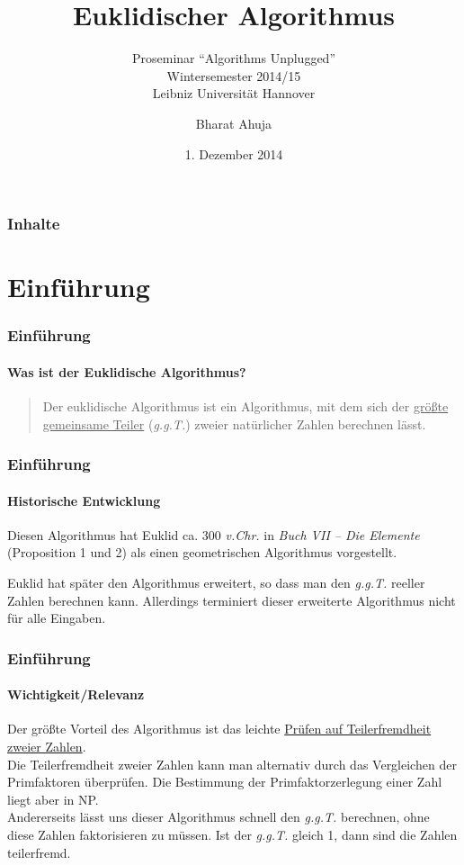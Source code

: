 \documentclass[•]{beamer}
\title{Euklidischer Algorithmus}
\subtitle{Proseminar ``Algorithms Unplugged''\\
Wintersemester 2014/15\\ 
Leibniz Universit\"at Hannover}
\date{1. Dezember 2014}
\author{Bharat Ahuja}
\begin{document}
\maketitle

\begin{frame}
	\frametitle{Inhalte}
	\tableofcontents[]
\end{frame}

\section{Einf\"uhrung}
\begin{frame}
	\frametitle{Einf\"uhrung}
    \framesubtitle{Was ist der Euklidische Algorithmus?}
    \begin{quote}
    Der euklidische Algorithmus ist ein Algorithmus, mit dem sich der 		\underline{gr\"o{\ss}te gemeinsame Teiler} (\textit{g.g.T.}) 			zweier nat\"urlicher Zahlen berechnen l\"asst. 
    
    \end{quote} 
\end{frame}

\begin{frame}       
	\frametitle{Einf\"uhrung}
    \framesubtitle{Historische Entwicklung}
    Diesen Algorithmus hat Euklid ca. 300 \textit{v.Chr.} in 				\textit{Buch VII -- Die Elemente} (Proposition 1 und 2) als einen 		geometrischen Algorithmus vorgestellt. 
    
    Euklid hat sp\"ater den Algorithmus erweitert, so dass man den 			\textit{g.g.T.} reeller Zahlen berechnen kann. Allerdings 				terminiert dieser erweiterte Algorithmus nicht f\"ur alle 				Eingaben.
    \end{frame}

\begin{frame}
	\frametitle{Einf\"uhrung}
    \framesubtitle{Wichtigkeit/Relevanz}
    Der gr\"o{\ss}te Vorteil des Algorithmus ist das leichte \underline{Pr\"ufen auf Teilerfremdheit zweier Zahlen}. \\ Die Teilerfremdheit zweier Zahlen kann man alternativ durch das Vergleichen der Primfaktoren \"uberpr\"ufen. Die Bestimmung der Primfaktorzerlegung einer Zahl liegt aber in NP. \\ Andererseits l\"asst uns dieser Algorithmus schnell den \textit{g.g.T.} berechnen, ohne diese Zahlen faktorisieren zu m\"ussen. Ist der \textit{g.g.T.} gleich 1, dann sind die Zahlen teilerfremd.
    
\end{frame}
\end{document}
